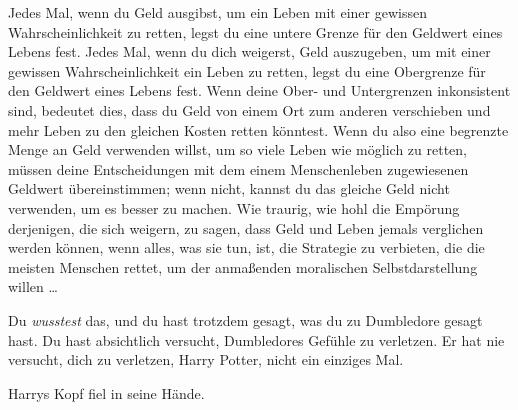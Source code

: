 \begin{em}
Jedes Mal, wenn du Geld ausgibst, um ein Leben mit einer gewissen Wahrscheinlichkeit zu retten, legst du eine untere Grenze für den Geldwert eines Lebens fest. Jedes Mal, wenn du dich weigerst, Geld auszugeben, um mit einer gewissen Wahrscheinlichkeit ein Leben zu retten, legst du eine Obergrenze für den Geldwert eines Lebens fest. Wenn deine Ober- und Untergrenzen inkonsistent sind, bedeutet dies, dass du Geld von einem Ort zum anderen verschieben und mehr Leben zu den gleichen Kosten retten könntest. Wenn du also eine begrenzte Menge an Geld verwenden willst, um so viele Leben wie möglich zu retten, müssen deine Entscheidungen mit dem einem Menschenleben zugewiesenen Geldwert übereinstimmen; wenn nicht, kannst du das gleiche Geld nicht verwenden, um es besser zu machen. Wie traurig, wie hohl die Empörung derjenigen, die sich weigern, zu sagen, dass Geld und Leben jemals verglichen werden können, wenn alles, was sie tun, ist, die Strategie zu verbieten, die die meisten Menschen rettet, um der anmaßenden moralischen Selbstdarstellung willen …



Du \emph{wusstest} das, und du hast trotzdem gesagt, was du zu Dumbledore gesagt hast. Du hast absichtlich versucht, Dumbledores Gefühle zu verletzen. Er hat nie versucht, dich zu verletzen, Harry Potter, nicht ein einziges Mal.
\end{em}
Harrys Kopf fiel in seine Hände.

